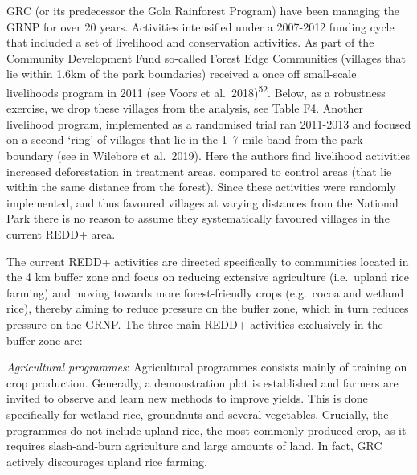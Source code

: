 \documentclass[
]{article}
\begin{document}
GRC (or its predecessor the Gola Rainforest Program) have been managing
the GRNP for over 20 years. Activities intensified under a 2007-2012
funding cycle that included a set of livelihood and conservation
activities. As part of the Community Development Fund so-called Forest
Edge Communities (villages that lie within 1.6km of the park boundaries)
received a once off small-scale livelihoods program in 2011 (see Voors
et al.~2018)\textsuperscript{52}. Below, as a robustness exercise, we
drop these villages from the analysis, see Table F4. Another livelihood
program, implemented as a randomised trial ran 2011-2013 and focused on
a second `ring' of villages that lie in the 1--7-mile band from the park
boundary (see in Wilebore et al.~2019). Here the authors find livelihood
activities increased deforestation in treatment areas, compared to
control areas (that lie within the same distance from the forest). Since
these activities were randomly implemented, and thus favoured villages
at varying distances from the National Park there is no reason to assume
they systematically favoured villages in the current REDD+ area.

The current REDD+ activities are directed specifically to communities
located in the 4 km buffer zone and focus on reducing extensive
agriculture (i.e.~upland rice farming) and moving towards more
forest-friendly crops (e.g.~cocoa and wetland rice), thereby aiming to
reduce pressure on the buffer zone, which in turn reduces pressure on
the GRNP. The three main REDD+ activities exclusively in the buffer zone
are:

\emph{Agricultural programmes}: Agricultural programmes consists mainly
of training on crop production. Generally, a demonstration plot is
established and farmers are invited to observe and learn new methods to
improve yields. This is done specifically for wetland rice, groundnuts
and several vegetables. Crucially, the programmes do not include upland
rice, the most commonly produced crop, as it requires slash-and-burn
agriculture and large amounts of land. In fact, GRC actively discourages
upland rice farming.
\end{document}
